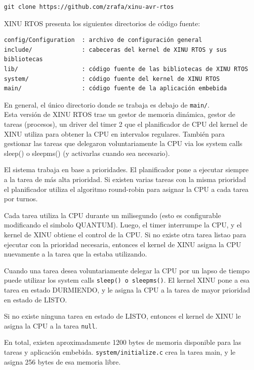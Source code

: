 \documentclass[output=paper, 
colorlinks,
citecolor=brown,
newtxmath
]{langscibook}
\begin{document}
\begin{verbatim}
git clone https://github.com/zrafa/xinu-avr-rtos
\end{verbatim}


\noindent XINU RTOS presenta los siguientes directorios de
código fuente:

\begin{verbatim}
config/Configuration  : archivo de configuración general
include/              : cabeceras del kernel de XINU RTOS y sus bibliotecas
lib/                  : código fuente de las bibliotecas de XINU RTOS
system/               : código fuente del kernel de XINU RTOS
main/                 : código fuente de la aplicación embebida
\end{verbatim}

\noindent En general, el único directorio donde se trabaja es debajo de \texttt{main/}.  \\

Esta versión de XINU RTOS trae un gestor de memoria dinámica, gestor de tareas
(procesos), un driver del timer 2 que el planificador de CPU del kernel de
XINU utiliza para obtener la CPU en intervalos regulares. También para
gestionar las tareas que delegaron voluntariamente la CPU via los system
calls sleep() o sleepms() (y activarlas cuando sea necesario).

El sistema trabaja en base a prioridades. El planificador pone a ejecutar
siempre a la tarea de más alta prioridad. Si existen varias tareas 
con la misma prioridad el planificador utiliza el algoritmo round-robin
para asignar la CPU a cada tarea por turnos.

Cada tarea utiliza la CPU durante un milisegundo (esto es configurable 
modificando el simbolo QUANTUM). Luego, el timer
interrumpe la CPU, y el kernel de XINU obtiene el control de la CPU.
Si no existe otra tarea listao para ejecutar con la prioridad necesaria,
entonces el kernel de XINU asigna la CPU nuevamente a la tarea que la estaba
utilizando.

Cuando una tarea desea voluntariamente delegar la CPU por un lapso de tiempo
puede utilizar los system calls \texttt{sleep() o sleepms()}. El kernel XINU pone
a esa tarea en estado DURMIENDO, y le asigna la CPU a la tarea de 
mayor prioridad en estado de LISTO.

Si no existe ninguna tarea en estado de LISTO, entonces el kernel de XINU
le asigna la CPU a la tarea \texttt{null}.

En total, existen aproximadamente 1200 bytes de memoria disponible
para las tareas y aplicación embebida.
\texttt{system/initialize.c} crea la tarea main, y le asigna 256 bytes 
de esa memoria libre.
\end{document}
